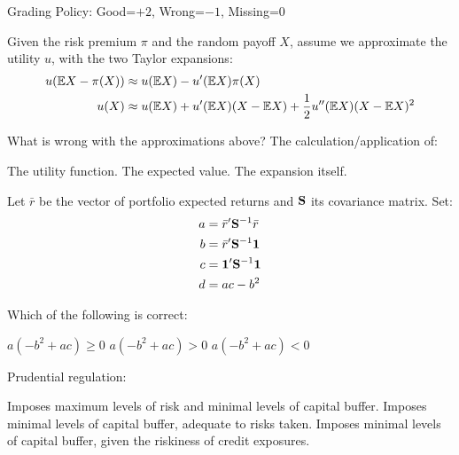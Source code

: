 \documentclass{exam}
\begin{document}
\noindent
{}


\bigskip\noindent 
Grading Policy: Good=$+2$, Wrong=$-1$, Missing=$0$

\begin{questions}

\question
Given the  risk premium $\pi$ and the random payoff $X$, assume we approximate the utility $u$, with the two  Taylor expansions:
\begin{align*}
u(\ex X - \pi(X)) &\approx  u(\ex X) - u'(\ex X) \pi(X) \\
u(X) &\approx u(\ex X) + u'(\ex X) (X-\ex X) + \frac{1}{2} u''(\ex X)(X-\ex X)^2
\end{align*}
  
What is wrong with the approximations above? The calculation/application of:
\begin{choices}
\CorrectChoice  The utility function.
\choice  The expected value.
\choice  The expansion itself.
\end{choices}

\question
Let  $\bar{r}$ be the vector of portfolio expected returns and  $\ss$ its covariance matrix. Set:
\begin{align*}
a&= \bar{r}'\ss^{-1} \bar{r}\\
b&= \bar{r}'\ss^{-1} \one \\
c&= \one'\ss^{-1} \one\\
d&= ac-b^2
\end{align*}

Which of the following is correct:
\begin{choices}
  \choice $
a( - b^2 +ac)\geq0
$
\CorrectChoice
$
a( - b^2 +ac) >0
$
\choice
$
a( - b^2 +ac) <0
$

\end{choices}

\question
Prudential regulation:
\begin{choices}
\choice        Imposes maximum levels of risk and  minimal levels of capital buffer.
\CorrectChoice Imposes minimal levels of capital buffer, adequate to risks taken.
\choice        Imposes minimal levels of capital buffer, given the riskiness of credit exposures.
\end{choices}


\end{questions}
\end{document}
